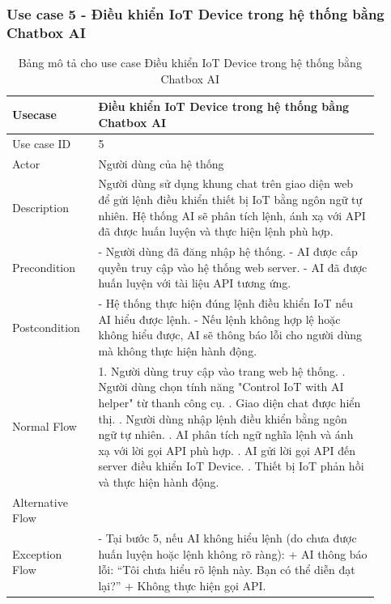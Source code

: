\subsubsection{Use case 5 - Điều khiển IoT Device trong hệ thống bằng Chatbox AI}

\renewcommand{\arraystretch}{1.6}
\begin{table}[H]
\centering
\begin{tabular}{|p{0.2\linewidth}|p{0.7\linewidth}|}
\hline
\rowcolor[HTML]{EFEFEF} 
\textbf{Usecase}        & \textbf{Điều khiển IoT Device trong hệ thống bằng Chatbox AI} \\ \hline
Use case ID             & 5 \\ \hline
Actor                   & Người dùng của hệ thống \\ \hline
Description             & Người dùng sử dụng khung chat trên giao diện web để gửi lệnh điều khiển thiết bị IoT bằng ngôn ngữ tự nhiên. Hệ thống AI sẽ phân tích lệnh, ánh xạ với API đã được huấn luyện và thực hiện lệnh phù hợp. \\ \hline
Precondition            & 
    - Người dùng đã đăng nhập hệ thống. \newline
    - AI được cấp quyền truy cập vào hệ thống web server. \newline
    - AI đã được huấn luyện với tài liệu API tương ứng.
\\ \hline
Postcondition           &  
    - Hệ thống thực hiện đúng lệnh điều khiển IoT nếu AI hiểu được lệnh. \newline
    - Nếu lệnh không hợp lệ hoặc không hiểu được, AI sẽ thông báo lỗi cho người dùng mà không thực hiện hành động.
\\ \hline
Normal Flow             & 
    1. Người dùng truy cập vào trang web hệ thống. \newline
    2. Người dùng chọn tính năng "Control IoT with AI helper" từ thanh công cụ. \newline
    3. Giao diện chat được hiển thị. \newline
    4. Người dùng nhập lệnh điều khiển bằng ngôn ngữ tự nhiên. \newline
    5. AI phân tích ngữ nghĩa lệnh và ánh xạ với lời gọi API phù hợp. \newline
    6. AI gửi lời gọi API đến server điều khiển IoT Device. \newline
    7. Thiết bị IoT phản hồi và thực hiện hành động.
\\ \hline
Alternative Flow          & 
\\ \hline
Exception Flow          &  
- Tại bước 5, nếu AI không hiểu lệnh (do chưa được huấn luyện hoặc lệnh không rõ ràng): \newline
+ AI thông báo lỗi: “Tôi chưa hiểu rõ lệnh này. Bạn có thể diễn đạt lại?” \newline
+ Không thực hiện gọi API.
\\ \hline
\end{tabular}
\caption{Bảng mô tả cho use case Điều khiển IoT Device trong hệ thống bằng Chatbox AI}
\end{table}

